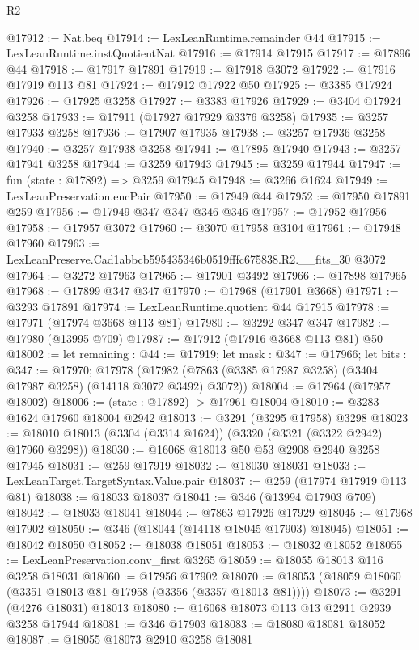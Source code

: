 \begin{lexlean}{R2}
\begin{coremodule}
@17912 := Nat.beq
@17914 := LexLeanRuntime.remainder @44
@17915 := LexLeanRuntime.instQuotientNat
@17916 := @17914 @17915
@17917 := @17896 @44
@17918 := @17917 @17891
@17919 := @17918 @3072
@17922 := @17916 @17919 @113 @81
@17924 := @17912 @17922 @50
@17925 := @3385 @17924
@17926 := @17925 @3258
@17927 := @3383 @17926
@17929 := @3404 @17924 @3258
@17933 := @17911 (@17927 @17929 @3376 @3258)
@17935 := @3257 @17933 @3258
@17936 := @17907 @17935
@17938 := @3257 @17936 @3258
@17940 := @3257 @17938 @3258
@17941 := @17895 @17940
@17943 := @3257 @17941 @3258
@17944 := @3259 @17943
@17945 := @3259 @17944
@17947 := fun (state : @17892) => @3259 @17945
@17948 := @3266 @1624
@17949 := LexLeanPreservation.encPair
@17950 := @17949 @44
@17952 := @17950 @17891 @259
@17956 := @17949 @347 @347 @346 @346
@17957 := @17952 @17956
@17958 := @17957 @3072
@17960 := @3070 @17958 @3104
@17961 := @17948 @17960
@17963 := LexLeanPreserve.Cad1abbcb595435346b0519fffc675838.R2.__fits_30 @3072
@17964 := @3272 @17963
@17965 := @17901 @3492
@17966 := @17898 @17965
@17968 := @17899 @347 @347
@17970 := @17968 (@17901 @3668)
@17971 := @3293 @17891
@17974 := LexLeanRuntime.quotient @44 @17915
@17978 := @17971 (@17974 @3668 @113 @81)
@17980 := @3292 @347 @347
@17982 := @17980 (@13995 @709)
@17987 := @17912 (@17916 @3668 @113 @81) @50
@18002 := let remaining : @44 := @17919;
  let mask : @347 := @17966;
  let bits : @347 := @17970;
  @17978 (@17982 (@7863 (@3385 @17987 @3258) (@3404 @17987 @3258) (@14118 @3072 @3492) @3072))
@18004 := @17964 (@17957 @18002)
@18006 := (state : @17892) -> @17961 @18004
@18010 := @3283 @1624 @17960 @18004 @2942
@18013 := @3291 (@3295 @17958) @3298
@18023 := @18010 @18013 (@3304 (@3314 @1624)) (@3320 (@3321 (@3322 @2942) @17960 @3298))
@18030 := @16068 @18013 @50 @53 @2908 @2940 @3258 @17945
@18031 := @259 @17919
@18032 := @18030 @18031
@18033 := LexLeanTarget.TargetSyntax.Value.pair
@18037 := @259 (@17974 @17919 @113 @81)
@18038 := @18033 @18037
@18041 := @346 (@13994 @17903 @709)
@18042 := @18033 @18041
@18044 := @7863 @17926 @17929
@18045 := @17968 @17902
@18050 := @346 (@18044 (@14118 @18045 @17903) @18045)
@18051 := @18042 @18050
@18052 := @18038 @18051
@18053 := @18032 @18052
@18055 := LexLeanPreservation.conv_first @3265
@18059 := @18055 @18013 @116 @3258 @18031
@18060 := @17956 @17902
@18070 := @18053 (@18059 @18060 (@3351 @18013 @81 @17958 (@3356 (@3357 @18013 @81))))
@18073 := @3291 (@4276 @18031) @18013
@18080 := @16068 @18073 @113 @13 @2911 @2939 @3258 @17944
@18081 := @346 @17903
@18083 := @18080 @18081 @18052
@18087 := @18055 @18073 @2910 @3258 @18081

\end{coremodule}
\end{lexlean}
